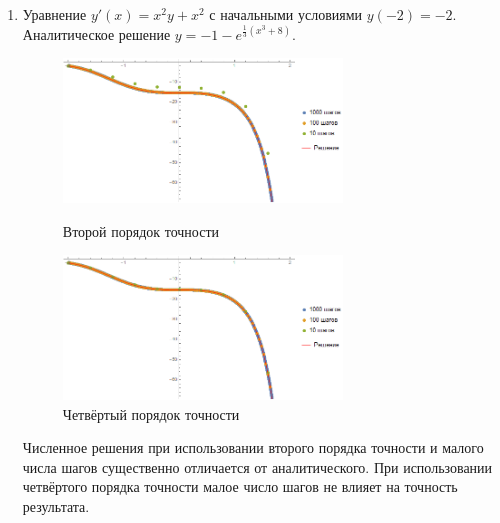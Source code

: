 \documentclass[a4paper,12pt,titlepage,finall]{article}
\begin{document}
\begin{enumerate}
\newpage
\item
Уравнение $y'(x) = x^2 y + x^2$ с начальными условиями $y(-2)=-2$. Аналитическое решение $y = -1 -e^{\frac{1}{3}(x^3 + 8)}$.
\begin{figure}[h]
\centering
\includegraphics[width=0.7\textwidth]{test_1_3_2.png}
\caption{Второй порядок точности}
\centering
\includegraphics[width=0.7\textwidth]{test_1_3_4.png}
\caption{Четвёртый порядок точности}
\end{figure}
\par
Численное решения при использовании второго порядка точности и малого числа шагов существенно отличается от аналитического. При использовании четвёртого порядка точности малое число шагов не влияет на точность результата.


\end{enumerate}
\end{document}
